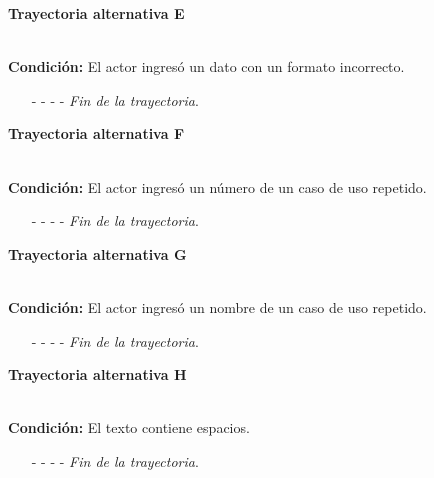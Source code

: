 \hypertarget{CU12-2:TAE}{\textbf{Trayectoria alternativa E}}\\
\noindent \textbf{Condición:} El actor ingresó un dato con un formato incorrecto.
\begin{enumerate}
	\UCpaso[\UCsist] Muestra el mensaje  señalando el campo que presenta el error en la pantalla .
	\UCpaso Regresa al paso \ref{CU12.2-P6} de la trayectoria principal.
	\item[- -] - - {\em {Fin de la trayectoria}}.
\end{enumerate}
\hypertarget{CU12-2:TAF}{\textbf{Trayectoria alternativa F}}\\
\noindent \textbf{Condición:} El actor ingresó un número de un caso de uso repetido.
\begin{enumerate}
	\UCpaso[\UCsist] Muestra el mensaje  señalando el campo que presenta la duplicidad en la pantalla .
	\UCpaso Regresa al paso \ref{CU12.2-P6} de la trayectoria principal.
	\item[- -] - - {\em {Fin de la trayectoria}}.
\end{enumerate}
\hypertarget{CU12-2:TAG}{\textbf{Trayectoria alternativa G}}\\
\noindent \textbf{Condición:} El actor ingresó un nombre de un caso de uso repetido.
\begin{enumerate}
	\UCpaso[\UCsist] Muestra el mensaje  señalando el campo que presenta la duplicidad en la pantalla .
	\UCpaso Regresa al paso \ref{CU12.2-P6} de la trayectoria principal.
	\item[- -] - - {\em {Fin de la trayectoria}}.
\end{enumerate}
\hypertarget{CU12-2:TAH}{\textbf{Trayectoria alternativa H}}\\
\noindent \textbf{Condición:} El texto contiene espacios.
\begin{enumerate}
	\UCpaso[\UCsist] Sustituye los espacios por guiones bajos.
	\UCpaso Continua en el \ref{CU12.2-TA1} de la trayectoria alternativa A.
	\item[- -] - - {\em {Fin de la trayectoria}}.
\end{enumerate}